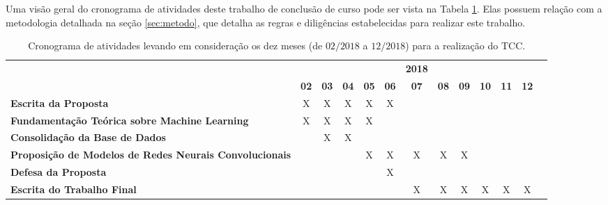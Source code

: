 
Uma visão geral do cronograma de atividades deste trabalho de conclusão de curso pode ser vista na Tabela \ref{tab:cronograma}. Elas possuem relação com a metodologia detalhada na seção \ref{sec:metodo}, que detalha as regras e diligências estabelecidas para realizar este trabalho.
\newline

\begin{table}
\caption{Cronograma de atividades levando em consideração os dez meses (de $02/2018$ a $12/2018$) para a realização do TCC.}
\label{tab:cronograma}
\begin{center}
\begin{small}
\begin{tabular}{p{5cm}cccccccccccc}
  \toprule
  & &  &  & &  & \textbf{2018}  & &  &  &  &  & \\
                                        & \textbf{02} & \textbf{03} & \textbf{04} & \textbf{05} & \textbf{06} & \textbf{07} & \textbf{08} & \textbf{09} & \textbf{10} & \textbf{11} & \textbf{12} \\
  \midrule
  \textbf{Escrita da Proposta}          &      X      &      X      &      X      &      X      &      X      &             &             &             &             &             &             \\
  \textbf{Fundamentação Teórica sobre
  Machine Learning}                     &      X      &      X      &      X      &      X      &             &             &             &             &             &             &             \\
  \textbf{Consolidação da Base de Dados}&             &      X      &      X      &             &             &             &             &             &             &             &             \\
  \textbf{Proposição de Modelos de
  Redes Neurais Convolucionais}         &             &             &             &      X      &      X      &      X      &      X      &      X      &             &             &             \\
  \textbf{Defesa da Proposta}          &             &             &             &             &      X      &             &             &             &             &             &             \\
  \textbf{Escrita do Trabalho Final}    &             &             &             &             &             &      X      &      X      &      X      &      X      &      X      &      X      \\

\end{tabular}
\end{small}
\end{center}
\end{table}
